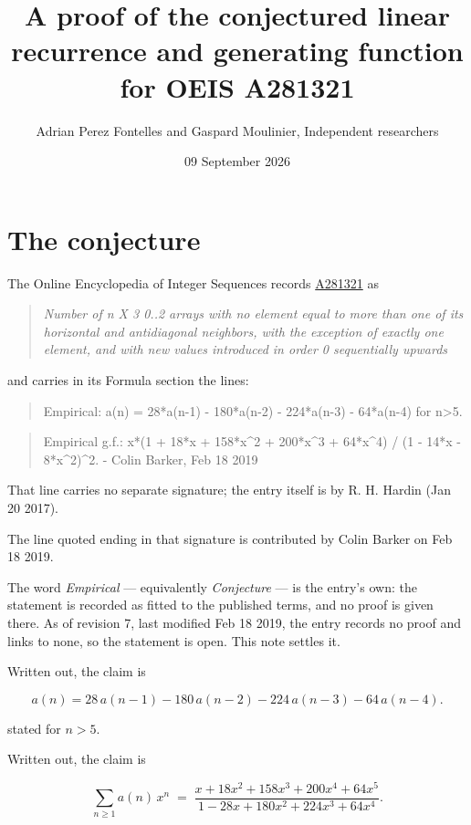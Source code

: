 \documentclass[11pt]{article}
\title{A proof of the conjectured linear recurrence and generating function for OEIS A281321}
\author{Adrian Perez Fontelles and Gaspard Moulinier, Independent researchers}
\date{09 September 2026}
\theoremstyle{definition}
\begin{document}
\maketitle
\section{The conjecture}

The Online Encyclopedia of Integer Sequences records \href{https://oeis.org/A281321}{A281321} as

\begin{quote}\itshape Number of n X 3 0..2 arrays with no element equal to more than one of its horizontal and antidiagonal neighbors, with the exception of exactly one element, and with new values introduced in order 0 sequentially upwards\end{quote}

and carries in its Formula section the lines:

\begin{quote}\ttfamily Empirical: a(n) = 28*a(n-1) - 180*a(n-2) - 224*a(n-3) - 64*a(n-4) for n>5.\end{quote}

\begin{quote}\ttfamily Empirical g.f.: x*(1 + 18*x + 158*x\textasciicircum{}2 + 200*x\textasciicircum{}3 + 64*x\textasciicircum{}4) / (1 - 14*x - 8*x\textasciicircum{}2)\textasciicircum{}2. - Colin Barker, Feb 18 2019\end{quote}

That line carries no separate signature; the entry itself is by R. H. Hardin (Jan 20 2017).

The line quoted ending in that signature is contributed by Colin Barker on Feb 18 2019.

The word {\itshape Empirical} --- equivalently {\itshape Conjecture} --- is the entry's own: the statement is recorded as fitted to the published terms, and no proof is given there. As of revision 7, last modified Feb 18 2019, the entry records no proof and links to none, so the statement is open. This note settles it.

Written out, the claim is

\[a(n) = 28\,a(n-1) - 180\,a(n-2) - 224\,a(n-3) - 64\,a(n-4).\]

stated for $n > 5$.

Written out, the claim is

\[\sum_{n \ge 1} a(n)\,x^n \;=\; \frac{x + 18x^{2} + 158x^{3} + 200x^{4} + 64x^{5}}{1 - 28x + 180x^{2} + 224x^{3} + 64x^{4}}.\]
\end{document}
